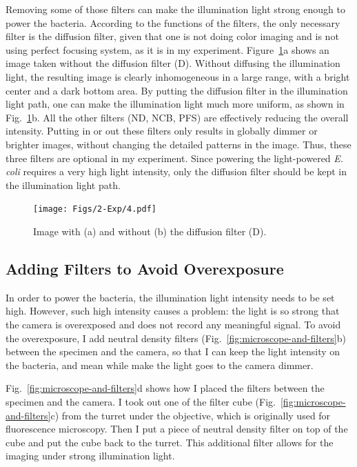 Removing some of those filters can make the illumination light strong enough to power the bacteria. According to the functions of the filters, the only necessary filter is the diffusion filter, given that one is not doing color imaging and is not using perfect focusing system, as it is in my experiment. Figure~\ref{fig:2-4}a shows an image taken without the diffusion filter (D). Without diffusing the illumination light, the resulting image is clearly inhomogeneous in a large range, with a bright center and a dark bottom area. By putting the diffusion filter in the illumination light path, one can make the illumination light much more uniform, as shown in Fig.~\ref{fig:2-4}b. All the other filters (ND, NCB, PFS) are effectively reducing the overall intensity. Putting in or out these filters only results in globally dimmer or brighter images, without changing the detailed patterns in the image. Thus, these three filters are optional in my experiment. Since powering the light-powered \textit{E. coli} requires a very high light intensity, only the diffusion filter should be kept in the illumination light path.

\begin{figure}[hp]
	\begin{center}
	\texttt{[image: Figs/2-Exp/4.pdf]}
	\end{center}
	\caption[Diffusion Filter Function Illustration]
	{
	Image with (a) and without (b) the diffusion filter (D).
	}
	\label{fig:2-4}
\end{figure}

\subsection{Adding Filters to Avoid Overexposure}

In order to power the bacteria, the illumination light intensity needs to be set high. However, such high intensity causes a problem: the light is so strong that the camera is overexposed and does not record any meaningful signal. To avoid the overexposure, I add neutral density filters (Fig.~\ref{fig:microscope-and-filters}b) between the specimen and the camera, so that I can keep the light intensity on the bacteria, and mean while make the light goes to the camera dimmer.

Fig.~\ref{fig:microscope-and-filters}d shows how I placed the filters between the specimen and the camera. I took out one of the filter cube (Fig.~\ref{fig:microscope-and-filters}c) from the turret under the objective, which is originally used for fluorescence microscopy. Then I put a piece of neutral density filter on top of the cube and put the cube back to the turret. This additional filter allows for the imaging under strong illumination light.

